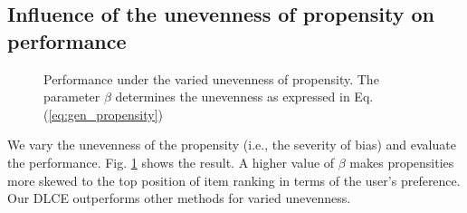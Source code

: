 \documentclass[manuscript,screen]{acmart}
\begin{document}
\subsection{Influence of the unevenness of propensity on performance}
\label{subsec:unevenness_propensity}
\begin{figure}[htbp]
	\begin{center}
		\caption{Performance under the varied unevenness of propensity.
		The parameter $\beta$ determines the unevenness as expressed in Eq. (\ref{eq:gen_propensity})}
		\label{fig:unevenProp}
	\end{center}
\end{figure}
We vary the unevenness of the propensity (i.e., the severity of bias) and evaluate the performance.
Fig. \ref{fig:unevenProp} shows the result.
A higher value of $\beta$ makes propensities more skewed to the top position of item ranking in terms of the user's preference.
Our DLCE outperforms other methods for varied unevenness.
\end{document}
